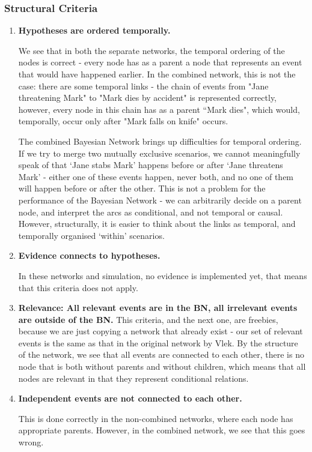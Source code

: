 \subsubsection{Structural Criteria}
\begin{enumerate}
\item \textbf{Hypotheses are ordered temporally.}

We see that in both the separate networks, the temporal ordering of the nodes is correct - every node has as a parent a node that represents an event that would have happened earlier. In the combined network, this is not the case: there are some temporal links - the chain of events from "Jane threatening Mark" to "Mark dies by accident" is represented correctly, however, every node in this chain has as a parent ``Mark dies", which would, temporally, occur only after "Mark falls on knife" occurs.

The combined Bayesian Network brings up difficulties for temporal ordering. If we try to merge two mutually exclusive scenarios, we cannot meaningfully speak of that `Jane stabs Mark' happens before or after `Jane threatens Mark' - either one of these events happen, never both, and no one of them will happen before or after the other. This is not a problem for the performance of the Bayesian Network - we can arbitrarily decide on a parent node, and interpret the arcs as conditional, and not temporal or causal. However, structurally, it is easier to think about the links as temporal, and temporally organised `within' scenarios. 

\item \textbf{Evidence connects to hypotheses.}

In these networks and simulation, no evidence is implemented yet, that means that this criteria does not apply.

\item \textbf{Relevance: All relevant events are in the BN, all irrelevant events are outside of the BN.}
This criteria, and the next one, are freebies, because we are just copying a network that already exist - our set of relevant events is the same as that in the original network by Vlek. By the structure of the network, we see that all events are connected to each other, there is no node that is both without parents and without children, which means that all nodes are relevant in that they represent conditional relations.

\item \textbf{Independent events are not connected to each other.}

This is done correctly in the non-combined networks, where each node has appropriate parents. However, in the combined network, we see that this goes wrong.

\end{enumerate}

